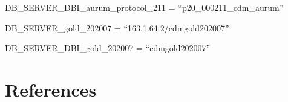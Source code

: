 \documentclass[
  letterpaper,
  DIV=11,
  numbers=noendperiod]{scrreprt}
\newlength{\cslhangindent}
\newlength{\cslentryspacingunit} %
\newenvironment{CSLReferences}[2] %
 {%
  \setlength{\parindent}{0pt}
  \ifodd #1
  \let\oldpar\par
  \def\par{\hangindent=\cslhangindent\oldpar}
  \fi
  \setlength{\parskip}{#2\cslentryspacingunit}
 }%
 {}
\begin{document}
DB\_SERVER\_DBI\_aurum\_protocol\_211 = ``p20\_000211\_cdm\_aurum''

DB\_SERVER\_gold\_202007 = ``163.1.64.2/cdmgold202007''

DB\_SERVER\_DBI\_gold\_202007 = ``cdmgold202007''


\hypertarget{references}{%
\chapter*{References}\label{references}}

\hypertarget{refs}{}
\begin{CSLReferences}{0}{0}
\end{CSLReferences}
\end{document}

